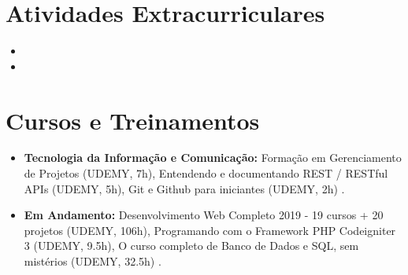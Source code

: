 \documentclass[11pt,a4paper,sans]{moderncv}        %
\begin{document}
\section{Atividades Extracurriculares}

\vspace{6pt}

\begin{itemize}

\item{}

\vspace{6pt}

\item{}



\end{itemize}

\vspace{2pt}

\section{Cursos e Treinamentos}

\vspace{6pt}

\begin{itemize}

\item \textbf{Tecnologia da Informação e Comunicação:} Formação em Gerenciamento de Projetos (UDEMY, 7h), Entendendo e documentando REST / RESTful APIs (UDEMY, 5h), Git e Github para iniciantes (UDEMY, 2h) .

\vspace{6pt}

\item \textbf{Em Andamento:} Desenvolvimento Web Completo 2019 - 19 cursos + 20 projetos (UDEMY, 106h), Programando com o Framework PHP Codeigniter 3 (UDEMY, 9.5h), O curso completo de Banco de Dados e SQL, sem mistérios (UDEMY, 32.5h) .


\vspace{6pt}



\end{itemize}
\end{document}
